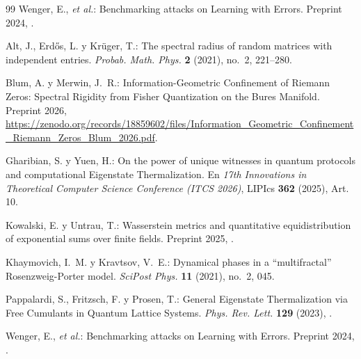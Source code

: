 \documentclass{article}
\numberwithin{equation}{section}
\theoremstyle{plain}
\theoremstyle{definition}
\begin{document}
\begin{thebibliography}{99}
Wenger, E., \emph{et al.}: 
Benchmarking attacks on Learning with Errors. 
Preprint 2024, .

Alt, J., Erdős, L. y Krüger, T.:
The spectral radius of random matrices with independent entries.
\emph{Probab. Math. Phys.} \textbf{2} (2021), no.~2, 221--280.

Blum, A. y Merwin, J.~R.:
Information-Geometric Confinement of Riemann Zeros: Spectral Rigidity from Fisher Quantization on the Bures Manifold.
Preprint 2026, \url{https://zenodo.org/records/18859602/files/Information_Geometric_Confinement_Riemann_Zeros_Blum_2026.pdf}.

Gharibian, S. y Yuen, H.:
On the power of unique witnesses in quantum protocols and computational Eigenstate Thermalization.
En \emph{17th Innovations in Theoretical Computer Science Conference (ITCS 2026)}, LIPIcs \textbf{362} (2025), Art. 10.

Kowalski, E. y Untrau, T.:
Wasserstein metrics and quantitative equidistribution of exponential sums over finite fields.
Preprint 2025, .

Khaymovich, I.~M. y Kravtsov, V.~E.: 
Dynamical phases in a ``multifractal'' Rosenzweig-Porter model.
\emph{SciPost Phys.} \textbf{11} (2021), no.~2, 045.

Pappalardi, S., Fritzsch, F. y Prosen, T.:
General Eigenstate Thermalization via Free Cumulants in Quantum Lattice Systems.
\emph{Phys. Rev. Lett.} \textbf{129} (2023), .

Wenger, E., \emph{et al.}: 
Benchmarking attacks on Learning with Errors. 
Preprint 2024, .

\end{thebibliography}
\end{document}
